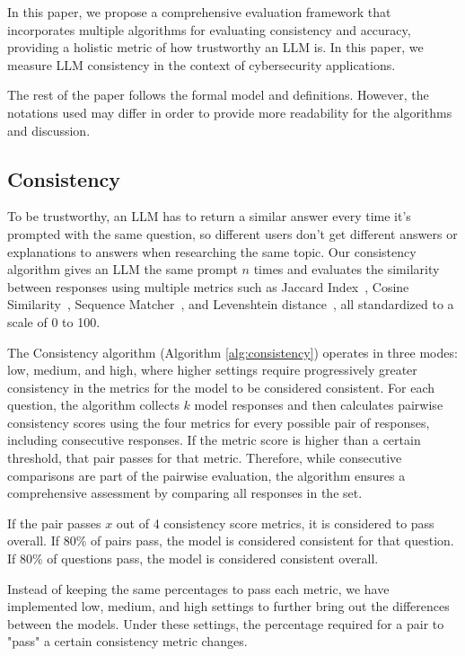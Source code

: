 In this paper, we propose a comprehensive evaluation framework that incorporates multiple algorithms for evaluating consistency and accuracy, providing a holistic metric of how trustworthy an LLM is. In this paper, we measure LLM consistency in the context of cybersecurity applications.

The rest of the paper follows the formal model and definitions. However, the notations used may differ in order to provide more readability for the algorithms and discussion.

\subsection{Consistency}

To be trustworthy, an LLM has to return a similar answer every time it’s prompted with the same question, so different users don’t get different answers or explanations to answers when researching the same topic. Our consistency algorithm gives an LLM the same prompt $n$ times and evaluates the similarity between responses using multiple metrics such as Jaccard Index~\cite{article}, Cosine Similarity~\cite{cosine_similarity}, Sequence Matcher~\cite{python_doc}, and Levenshtein distance~\cite{levenshtein_distance}, all standardized to a scale of 0 to 100. 

The Consistency algorithm (Algorithm \ref{alg:consistency}) operates in three modes: low, medium, and high, where higher settings require progressively greater consistency in the metrics for the model to be considered consistent. For each question, the algorithm collects $k$ model responses and then calculates pairwise consistency scores using the four metrics for every possible pair of responses, including consecutive responses. If the metric score is higher than a certain threshold, that pair passes for that metric. Therefore, while consecutive comparisons are part of the pairwise evaluation, the algorithm ensures a comprehensive assessment by comparing all responses in the set. 

If the pair passes $x$ out of 4 consistency score metrics, it is considered to pass overall. If 80\% of pairs pass, the model is considered consistent for that question. If 80\% of questions pass, the model is considered consistent overall.

Instead of keeping the same percentages to pass each metric, we have implemented low, medium, and high settings to further bring out the differences between the models. Under these settings, the percentage required for a pair to "pass" a certain consistency metric changes. 

